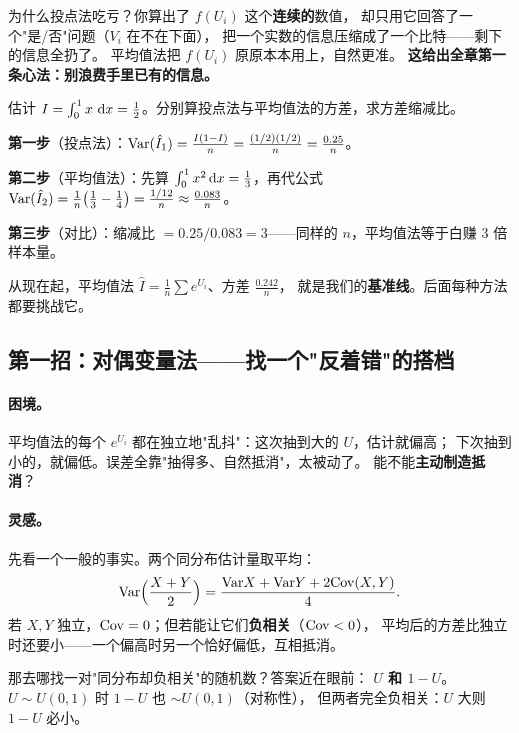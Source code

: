 \begin{pbox}
为什么投点法吃亏？你算出了 $f(U_i)$ 这个\textbf{连续的}数值，
却只用它回答了一个"是/否"问题（$V_i$ 在不在下面），
把一个实数的信息压缩成了一个比特——剩下的信息全扔了。
平均值法把 $f(U_i)$ 原原本本用上，自然更准。
\textbf{这给出全章第一条心法：别浪费手里已有的信息。}
\end{pbox}

\begin{exbox}[两法方差对比]
估计 $I=\int_0^1 x\,\,\mathrm{d} x=\frac12$。分别算投点法与平均值法的方差，求方差缩减比。
\end{exbox}
\begin{sol}
\textbf{第一步}（投点法）：$\mathrm{Var}(\hat I_1)=\frac{I(1-I)}{n}=\frac{(1/2)(1/2)}{n}=\frac{0.25}{n}$。

\textbf{第二步}（平均值法）：先算 $\int_0^1x^2\,\mathrm{d} x=\frac13$，再代公式
$\mathrm{Var}(\hat I_2)=\frac1n\big(\frac13-\frac14\big)=\frac{1/12}{n}\approx\frac{0.083}{n}$。

\textbf{第三步}（对比）：缩减比 $=0.25/0.083=3$——同样的 $n$，平均值法等于白赚 3 倍样本量。
\end{sol}

从现在起，平均值法 $\hat I=\frac1n\sum e^{U_i}$、方差 $\frac{0.242}{n}$，
就是我们的\textbf{基准线}。后面每种方法都要挑战它。

\subsection{第一招：对偶变量法——找一个"反着错"的搭档}

\paragraph{困境。}
平均值法的每个 $e^{U_i}$ 都在独立地"乱抖"：这次抽到大的 $U$，估计就偏高；
下次抽到小的，就偏低。误差全靠"抽得多、自然抵消"，太被动了。
能不能\textbf{主动制造抵消}？

\paragraph{灵感。}
先看一个一般的事实。两个同分布估计量取平均：
\[
\mathrm{Var}\Big(\frac{X+Y}{2}\Big)=\frac{\mathrm{Var} X+\mathrm{Var} Y+2\mathrm{Cov}(X,Y)}{4}.
\]
若 $X,Y$ 独立，$\mathrm{Cov}=0$；但若能让它们\textbf{负相关}（$\mathrm{Cov}<0$），
平均后的方差比独立时还要小——一个偏高时另一个恰好偏低，互相抵消。

那去哪找一对"同分布却负相关"的随机数？答案近在眼前：
\textbf{$U$ 和 $1-U$}。$U\sim U(0,1)$ 时 $1-U$ 也 $\sim U(0,1)$（对称性），
但两者完全负相关：$U$ 大则 $1-U$ 必小。

